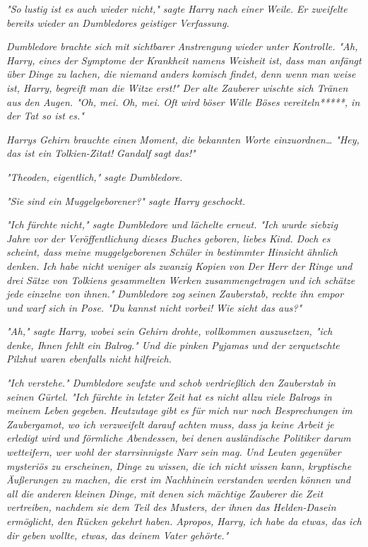 {\emph{"\emph{So}} \emph{lustig ist es auch wieder nicht," sagte Harry nach einer Weile. Er zweifelte bereits wieder an Dumbledores geistiger Verfassung.}

\emph{Dumbledore brachte sich mit sichtbarer Anstrengung wieder unter Kontrolle. "Ah, Harry, eines der Symptome der Krankheit namens Weisheit ist, dass man anfängt über Dinge zu lachen, die niemand anders komisch findet, denn wenn man weise ist, Harry, begreift man die Witze erst!" Der alte Zauberer wischte sich Tränen aus den Augen. "Oh, mei. Oh, mei. Oft wird böser Wille Böses vereiteln*****, in der Tat so ist es."}

\emph{Harrys Gehirn brauchte einen Moment, die bekannten Worte einzuordnen… "Hey, das ist ein} \emph{\emph{Tolkien}-Zitat!} \emph{\emph{Gandalf}} \emph{sagt das!"}

\emph{"Theoden, eigentlich," sagte Dumbledore.}

\emph{"Sie sind ein} \emph{\emph{Muggelgeborener?}" sagte Harry geschockt.}

\emph{"Ich fürchte nicht," sagte Dumbledore und lächelte erneut. "Ich wurde siebzig Jahre vor der Veröffentlichung dieses Buches geboren, liebes Kind. Doch es scheint, dass meine muggelgeborenen Schüler in bestimmter Hinsicht ähnlich denken. Ich habe nicht weniger als zwanzig Kopien von} \emph{\emph{Der Herr der Ringe}} \emph{und drei Sätze von Tolkiens gesammelten Werken zusammengetragen und ich schätze jede einzelne von ihnen." Dumbledore zog seinen Zauberstab, reckte ihn empor und warf sich in Pose. "\emph{Du kannst nicht vorbei!}} \emph{Wie sieht das aus?"}

\emph{"Ah," sagte Harry, wobei sein Gehirn drohte, vollkommen auszusetzen, "ich denke, Ihnen fehlt ein Balrog." Und die pinken Pyjamas und der} \emph{zerquetschte Pilzhut waren ebenfalls nicht hilfreich.}

\emph{"Ich verstehe." Dumbledore seufzte und schob verdrießlich den Zauberstab in seinen Gürtel. "Ich fürchte in letzter Zeit hat es nicht allzu viele Balrogs in meinem Leben gegeben. Heutzutage gibt es für mich nur noch Besprechungen im Zaubergamot, wo ich verzweifelt darauf achten muss, dass ja keine Arbeit je erledigt wird und förmliche Abendessen, bei denen ausländische Politiker darum wetteifern, wer wohl der starrsinnigste Narr sein mag. Und Leuten gegenüber mysteriös zu erscheinen, Dinge zu wissen, die ich nicht wissen kann, kryptische Äußerungen zu machen, die erst im Nachhinein verstanden werden können und all die anderen kleinen Dinge, mit denen sich mächtige Zauberer die Zeit vertreiben, nachdem sie dem Teil des Musters, der ihnen das Helden-Dasein ermöglicht, den Rücken gekehrt haben. Apropos, Harry, ich habe da etwas, das ich dir geben wollte, etwas, das deinem Vater gehörte."}

}
